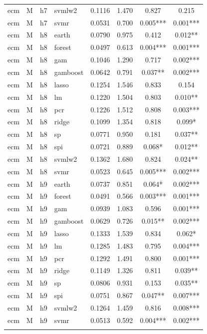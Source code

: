\begin{ThreePartTable}
\begin{longtable}[t]{llclcccc}
ecm & M & h7 & svmlw2 & 0.1116 & 1.470 & 0.827 & 0.215\\
ecm & M & h7 & svmr & 0.0531 & 0.700 & 0.005*** & 0.001***\\
\addlinespace
ecm & M & h8 & earth & 0.0790 & 0.975 & 0.412 & 0.012**\\
ecm & M & h8 & forest & 0.0497 & 0.613 & 0.004*** & 0.001***\\
ecm & M & h8 & gam & 0.1046 & 1.290 & 0.717 & 0.002***\\
ecm & M & h8 & gamboost & 0.0642 & 0.791 & 0.037** & 0.002***\\
ecm & M & h8 & lasso & 0.1254 & 1.546 & 0.833 & 0.154\\
ecm & M & h8 & lm & 0.1220 & 1.504 & 0.803 & 0.010**\\
ecm & M & h8 & pcr & 0.1226 & 1.512 & 0.808 & 0.003***\\
ecm & M & h8 & ridge & 0.1099 & 1.354 & 0.818 & 0.099*\\
ecm & M & h8 & sp & 0.0771 & 0.950 & 0.181 & 0.037**\\
ecm & M & h8 & spi & 0.0721 & 0.889 & 0.068* & 0.012**\\
ecm & M & h8 & svmlw2 & 0.1362 & 1.680 & 0.824 & 0.024**\\
ecm & M & h8 & svmr & 0.0523 & 0.645 & 0.005*** & 0.002***\\
\addlinespace
ecm & M & h9 & earth & 0.0737 & 0.851 & 0.064* & 0.002***\\
ecm & M & h9 & forest & 0.0491 & 0.566 & 0.003*** & 0.001***\\
ecm & M & h9 & gam & 0.0939 & 1.083 & 0.596 & 0.001***\\
ecm & M & h9 & gamboost & 0.0629 & 0.726 & 0.015** & 0.002***\\
ecm & M & h9 & lasso & 0.1333 & 1.539 & 0.834 & 0.062*\\
ecm & M & h9 & lm & 0.1285 & 1.483 & 0.795 & 0.004***\\
ecm & M & h9 & pcr & 0.1292 & 1.491 & 0.800 & 0.001***\\
ecm & M & h9 & ridge & 0.1149 & 1.326 & 0.811 & 0.039**\\
ecm & M & h9 & sp & 0.0806 & 0.931 & 0.153 & 0.035**\\
ecm & M & h9 & spi & 0.0751 & 0.867 & 0.047** & 0.007***\\
ecm & M & h9 & svmlw2 & 0.1264 & 1.459 & 0.816 & 0.008***\\
ecm & M & h9 & svmr & 0.0513 & 0.592 & 0.004*** & 0.002***\\
\addlinespace

\end{longtable}
\end{ThreePartTable}
